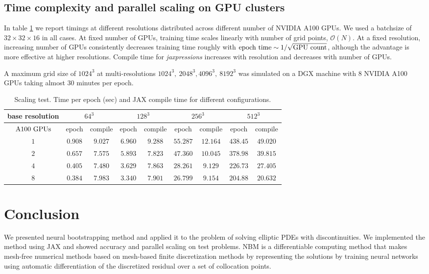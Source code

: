 \documentclass{article}
\begin{document}
\subsection{Time complexity and parallel scaling on GPU clusters}
In table \ref{tab:scaling} we report timings at different resolutions distributed across different number of NVIDIA A100 GPUs. We used a batchsize of $32\times 32\times 16$ in all cases. At fixed number of GPUs, training time scales linearly with number of grid points, $\mathcal{O}(N)$. At a fixed resolution, increasing number of GPUs consistently decreases training time roughly with $\rm epoch\ time \sim 1/\sqrt{GPU\ count}$, although the advantage is more effective at higher resolutions. Compile time for \textit{jaxpressions} increases with resolution and decreases with number of GPUs.

A maximum grid size of $1024^3$ at multi-resolutions $1024^3,\ 2048^3, 4096^3,\ 8192^3$ was simulated on a DGX machine with 8 NVIDIA A100 GPUs taking almost $30$ minutes per epoch. 

\begin{table}[ht]
\begin{center}
\caption{Scaling test. Time per epoch (sec) and JAX compile time for different configurations.} \label{tab:scaling}
\begin{tabular}{|c||cc|cc|cc|cc|}
\hline
base resolution & \multicolumn{2}{c|}{$64^3$}& \multicolumn{2}{c|}{$128^3$} & \multicolumn{2}{c|}{$256^3$}  & \multicolumn{2}{c|}{$512^3$}\\
\hline
$\rm A100\ GPUs$ &  epoch  &  compile   &  epoch   & compile &    epoch & compile  &  epoch    &   compile \\
\hline 
$1$        & $0.908$ &  $9.027$   & $6.960$  & $9.288$ & $55.287$ & $12.164$ &  $438.45$  &  $49.020$ \\
$2$        & $0.657$ &  $7.575$   & $5.893$  & $7.823$ & $47.360$ & $10.045$ &  $378.98$  &  $39.815$ \\ 
$4$        & $0.405$ &  $7.480$   & $3.629$  & $7.863$ & $28.261$ & $9.129$  &  $226.73$  &  $27.405$ \\ 
$8$        & $0.384$ &  $7.983$   & $3.340$  & $7.901$ & $26.799$ & $9.154$  &  $204.88$  &  $20.632$\\ \hline
\end{tabular}
\end{center}
\end{table}


\section{Conclusion}
We presented neural bootstrapping method and applied it to the problem of solving elliptic PDEs with discontinuities. We implemented the method using JAX and showed accuracy and parallel scaling on test problems. NBM is a differentiable computing method that makes mesh-free numerical methods based on mesh-based finite discretization methods by representing the solutions by training neural networks using automatic differentiation of the discretized residual over a set of collocation points.
\end{document}
